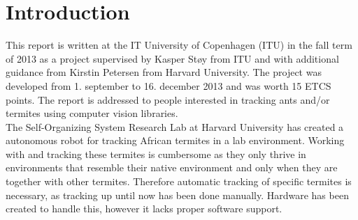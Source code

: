 
\section{Introduction}

% 
% 

This report is written at the IT University of Copenhagen (ITU) in the fall term of 2013 as a project supervised by Kasper Støy from ITU and with additional guidance from Kirstin Petersen from Harvard University. The project was developed from 1. september to 16. december 2013 and was worth 15 ETCS points. The report is addressed to people interested in tracking ants and/or termites using computer vision libraries. \\

The Self-Organizing System Research Lab at Harvard University has created a autonomous robot for tracking African termites in a lab environment. Working with and tracking these termites is cumbersome as they only thrive in environments that resemble their native environment and only when they are together with other termites. Therefore automatic tracking of specific termites is necessary, as tracking up until now has been done manually. Hardware has been created to handle this, however it lacks proper software support. \\

